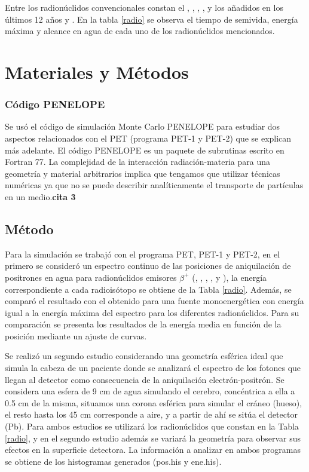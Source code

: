 \documentclass[12pt,a4paper,onecolumn]{article}
\begin{document}
Entre los radionúclidos convencionales constan el , , , , y los añadidos en los últimos 12 años  y . En la tabla \ref{radio} se observa el tiempo de semivida, energía máxima y alcance en agua de cada uno de los radionúclidos mencionados.

\section{Materiales y Métodos}
\subsubsection*{Código PENELOPE}
Se usó el código de simulación Monte Carlo PENELOPE para estudiar dos aspectos relacionados con el PET (programa PET-1 y PET-2) que se explican más adelante. El código PENELOPE es un paquete de subrutinas escrito en Fortran 77. La complejidad de la interacción radiación-materia para una geometría y material arbitrarios implica que tengamos que utilizar técnicas numéricas ya que no se puede describir analíticamente el transporte de partículas en un medio.\textbf{cita 3}

\subsection*{Método}
Para la simulación se trabajó con el programa PET, PET-1 y PET-2, en el primero se consideró un espectro continuo de las posiciones de aniquilación de positrones en agua para radionúclidos emisores $\beta^+$ (, , , ,  y ), la energía correspondiente a cada radioisótopo se obtiene de la Tabla \ref{radio}. Además, se comparó el resultado con el obtenido para una fuente monoenergética con energía igual a la energía máxima del espectro para los diferentes radionúclidos. Para su comparación se presenta los resultados de la energía media en función de la posición mediante un ajuste de curvas.
  
Se realizó un segundo estudio considerando una geometría esférica ideal que simula la cabeza de un paciente donde se analizará el espectro de los fotones que llegan al detector como consecuencia de la aniquilación electrón-positrón. Se considera una esfera de 9 cm de agua simulando el cerebro, concéntrica a ella a 0.5 cm de la misma, situamos una corona esférica para simular el cráneo (hueso), el resto hasta los 45 cm corresponde a aire, y a partir de ahí se sitúa el detector (Pb). Para ambos estudios se utilizará los radionúclidos que constan en la Tabla \ref{radio}, y en el segundo estudio además se variará la geometría para observar sus efectos en la superficie detectora. La información a analizar en ambos programas se obtiene de los histogramas generados (pos.his y ene.his).
\end{document}
